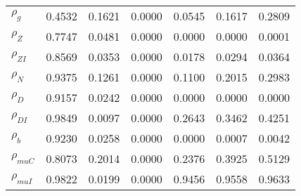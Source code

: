 \begin{center}
\begin{longtable}{lcccccc}
$ {\rho_g}             $	 & 	          0.4532	 & 	          0.1621	 & 	          0.0000	 & 	          0.0545	 & 	          0.1617	 & 	          0.2809 \\ 
$ {\rho_Z}             $	 & 	          0.7747	 & 	          0.0481	 & 	          0.0000	 & 	          0.0000	 & 	          0.0000	 & 	          0.0001 \\ 
$ {\rho_{ZI}}          $	 & 	          0.8569	 & 	          0.0353	 & 	          0.0000	 & 	          0.0178	 & 	          0.0294	 & 	          0.0364 \\ 
$ {\rho_N}             $	 & 	          0.9375	 & 	          0.1261	 & 	          0.0000	 & 	          0.1100	 & 	          0.2015	 & 	          0.2983 \\ 
$ {\rho_D}             $	 & 	          0.9157	 & 	          0.0242	 & 	          0.0000	 & 	          0.0000	 & 	          0.0000	 & 	          0.0000 \\ 
$ {\rho_{DI}}          $	 & 	          0.9849	 & 	          0.0097	 & 	          0.0000	 & 	          0.2643	 & 	          0.3462	 & 	          0.4251 \\ 
$ {\rho_b}             $	 & 	          0.9230	 & 	          0.0258	 & 	          0.0000	 & 	          0.0000	 & 	          0.0007	 & 	          0.0042 \\ 
$ {\rho_{muC}}         $	 & 	          0.8073	 & 	          0.2014	 & 	          0.0000	 & 	          0.2376	 & 	          0.3925	 & 	          0.5129 \\ 
$ {\rho_{muI}}         $	 & 	          0.9822	 & 	          0.0199	 & 	          0.0000	 & 	          0.9456	 & 	          0.9558	 & 	          0.9633 \\ 
\end{longtable}
 \end{center}
